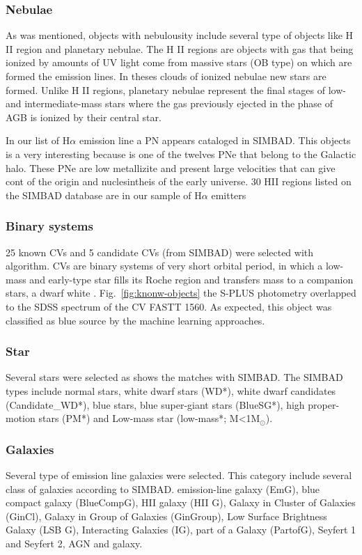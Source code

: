 \documentclass[fleqn,usenatbib]{mnras}
\begin{document}
{\subsubsection{Nebulae}

As was mentioned, objects with nebulousity include several
type of objects like H II region and  planetary nebulae.
The H II regions are objects with gas that being ionized by
amounts of UV light come from massive stars (OB type) on which
are formed the emission lines. In theses clouds of ionized nebulae
new stars are formed. Unlike H II regions, planetary nebulae
represent the final stages of low- and intermediate-mass stars
where the gas previously ejected in the phase of AGB is ionized
by their central star.

In our list of H{$\alpha$} emission line a PN appears cataloged in SIMBAD.
This objects is a very interesting because is one of the twelves PNe that belong
to the Galactic halo. These PNe are low metallizite and present large velocities that
can give cont of the origin and nuclesintheis of the early universe. 30 HII regions
listed on the SIMBAD database are in our sample of H{$\alpha$} emitters

\subsubsection{Binary systems}
25 known CVs and 5 candidate CVs (from SIMBAD) were selected with algorithm.
CVs are binary systems of very short orbital period, in which a low-mass and
early-type star fills its Roche region and transfers mass to a companion stars,
a dwarf white \citep{Patterson:1984}. Fig.~\ref{fig:knonw-objects} the S-PLUS
photometry overlapped to the SDSS spectrum of the CV FASTT 1560. As expected,
this object was classified as blue source by the machine learning approaches.

\subsubsection{Star}
Several stars were selected as shows the matches with SIMBAD.
The SIMBAD types include normal stars, white dwarf stars (WD*), white dwarf
candidates (Candidate\_WD*), blue stars, blue super-giant stars (BlueSG*), high
proper-motion stars (PM*) and Low-mass star (low-mass*; M<1M$_\odot$). 

\subsubsection{Galaxies}
Several type of emission line galaxies were selected. This category include
several class of galaxies according to SIMBAD. emission-line galaxy (EmG),
blue compact galaxy (BlueCompG), HII galaxy (HII G), Galaxy in Cluster of Galaxies
(GinCl), Galaxy in Group of Galaxies (GinGroup), Low Surface Brightness Galaxy
(LSB G), Interacting Galaxies (IG), part of a Galaxy (PartofG), Seyfert 1 and
Seyfert 2, AGN and galaxy.

}
\end{document}
